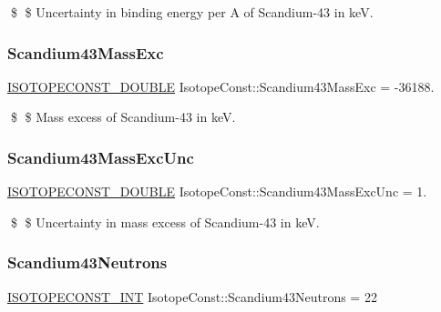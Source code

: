 \$ \$ Uncertainty in binding energy per A of Scandium-\/43 in keV. \mbox{\label{group___isotope_const-_scandium-_sc43_ga792a137433a7f858295d863c9968dd53}} 
\subsubsection{\texorpdfstring{Scandium43\+Mass\+Exc}{Scandium43MassExc}}
{\footnotesize\ttfamily \mbox{\hyperlink{group___isotope_const-_macros_ga8f45a7272ce02c0b4c65c44636ed719a}{I\+S\+O\+T\+O\+P\+E\+C\+O\+N\+S\+T\+\_\+\+D\+O\+U\+B\+LE}} Isotope\+Const\+::\+Scandium43\+Mass\+Exc = -\/36188.}

\$ \$ Mass excess of Scandium-\/43 in keV. \mbox{\label{group___isotope_const-_scandium-_sc43_ga9d473122151e6fc16c9278f8984932ed}} 
\subsubsection{\texorpdfstring{Scandium43\+Mass\+Exc\+Unc}{Scandium43MassExcUnc}}
{\footnotesize\ttfamily \mbox{\hyperlink{group___isotope_const-_macros_ga8f45a7272ce02c0b4c65c44636ed719a}{I\+S\+O\+T\+O\+P\+E\+C\+O\+N\+S\+T\+\_\+\+D\+O\+U\+B\+LE}} Isotope\+Const\+::\+Scandium43\+Mass\+Exc\+Unc = 1.}

\$ \$ Uncertainty in mass excess of Scandium-\/43 in keV. \mbox{\label{group___isotope_const-_scandium-_sc43_ga3982cee31012f8617db84165e8c1d714}} 
\subsubsection{\texorpdfstring{Scandium43\+Neutrons}{Scandium43Neutrons}}
{\footnotesize\ttfamily \mbox{\hyperlink{group___isotope_const-_macros_ga5f18360b3e99483a35c32d789e62621c}{I\+S\+O\+T\+O\+P\+E\+C\+O\+N\+S\+T\+\_\+\+I\+NT}} Isotope\+Const\+::\+Scandium43\+Neutrons = 22}

